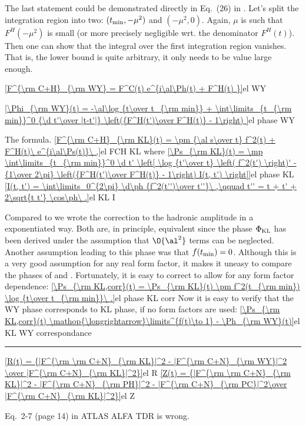 The last statement could be demonstrated directly in Eq.~(26) in . Let's split the integration region into two: $(t_{\rm min}, -\mu^2)$ and $(-\mu^2, 0)$. Again, $\mu$ is such that $F^H(-\mu^2)$ is small (or more precisely negligible wrt. the denominator $F^H(t)$). Then one can show that the integral over the first integration region vanishes. That is, the lower bound is quite arbitrary, it only needs to be value large enough.

\eqref{F^{\rm C+H}_{\rm WY} = F^C(t) e^{i\al\Ph(t) + F^H(t) }}{el WY}

\eqref{\Phi_{\rm WY}(t) =  -\al\log {t\over t_{\rm min}} + \int\limits_{t_{\rm min}}^0 {\d t'\over |t-t'|} \left({F^H(t')\over F^H(t)} - 1\right) }{el phase WY}


The \KL{} formula.
\eqref{F^{\rm C+H}_{\rm KL}(t) = \pm {\al s\over t} f^2(t) + F^H(t)\ e^{i\al\Ps(t)}\ ,}{el FCH KL}
where
\eqref{\Ps_{\rm KL}(t) = \mp \int\limits_{t_{\rm min}}^0 \d t' \left[ \log {t'\over t} \left( f^2(t') \right)' - {1\over 2\pi} \left({F^H(t')\over F^H(t)} - 1\right) I(t, t') \right]}{el phase KL}
\eqref{I(t, t') = \int\limits_0^{2\pi} \d\ph {f^2(t'')\over t''}\ ,\qquad t'' = t + t' + 2\sqrt{t t'} \cos\ph\ .}{el KL I}

Compared to  we wrote the correction to the hadronic amplitude in a exponentiated way. Both are, in principle, equivalent since the phase $\Phi_{\rm KL}$ has been derived under the assumption that $\O{\al^2}$ terms can be neglected. Another assumption leading to this phase was that $f(t_{\rm min}) = 0$. Although this is a very good assumption for any real form factor, it makes it uneasy to compare the phases of \KL{} and \WY. Fortunately, it is easy to correct  to allow for any form factor dependence:
\eqref{\Ps_{\rm KL,corr}(t) = \Ps_{\rm KL}(t) \pm f^2(t_{\rm min}) \log {t\over t_{\rm min}}\ .}{el phase KL corr}
Now it is easy to verify that the WY phase corresponds to KL phase, if no form factors are used:
\eqref{\Ps_{\rm KL,corr}(t) \mathop{\longrightarrow}\limits^{f(t)\to 1} - \Ph_{\rm WY}(t)}{el KL WY correspondance}

\fi

\vskip1cm
\hrule

\eqref{R(t) = {|F^{\rm \rm C+N}_{\rm KL}|^2 - |F^{\rm C+N}_{\rm WY}|^2 \over |F^{\rm C+N}_{\rm KL}|^2}}{el R}
\eqref{Z(t) = {|F^{\rm \rm C+N}_{\rm KL}|^2 - |F^{\rm C+N}_{\rm PH}|^2 - |F^{\rm C+N}_{\rm PC}|^2\over |F^{\rm C+N}_{\rm KL}|^2}}{el Z}



Eq.~2-7 (page 14) in ATLAS ALFA TDR  is wrong.


